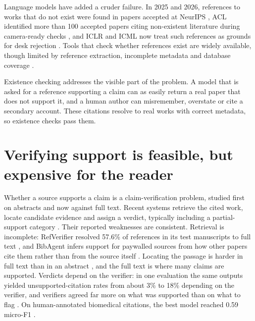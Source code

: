 \documentclass[11pt]{article}
\begin{document}
Language models have added a cruder failure. In 2025 and 2026, references to works that do not exist were found in papers accepted at NeurIPS \citep{ansari2026compound,russinovich2026phantom}, ACL identified more than 100 accepted papers citing non-existent literature during camera-ready checks \citep{acl2026statement}, and ICLR and ICML now treat such references as grounds for desk rejection \citep{iclr2026response,russinovich2026phantom}. Tools that check whether references exist are widely available, though limited by reference extraction, incomplete metadata and database coverage \citep{badalova2026hallucinated}.

Existence checking addresses the visible part of the problem. A model that is asked for a reference supporting a claim can as easily return a real paper that does not support it, and a human author can misremember, overstate or cite a secondary account. These citations resolve to real works with correct metadata, so existence checks pass them.

\section{Verifying support is feasible, but expensive for the reader}

Whether a source supports a claim is a claim-verification problem, studied first on abstracts \citep{wadden2020scifact} and now against full text. Recent systems retrieve the cited work, locate candidate evidence and assign a verdict, typically including a partial-support category \citep{haan2025semanticcite,mocan2026refverifier,sadeghi2026deepsciverify,lee2026reflens,li2026bibagent}. Their reported weaknesses are consistent. Retrieval is incomplete: RefVerifier resolved 57.6\% of references in its test manuscripts to full text \citep{mocan2026refverifier}, and BibAgent infers support for paywalled sources from how other papers cite them rather than from the source itself \citep{li2026bibagent}. Locating the passage is harder in full text than in an abstract \citep{mocan2026refverifier,sadeghi2026deepsciverify}, and the full text is where many claims are supported. Verdicts depend on the verifier: in one evaluation the same outputs yielded unsupported-citation rates from about 3\% to 18\% depending on the verifier, and verifiers agreed far more on what was supported than on what to flag \citep{goo2026citefaithfulness}. On human-annotated biomedical citations, the best model reached 0.59 micro-F1 \citep{sarol2024citationintegrity}.
\end{document}
